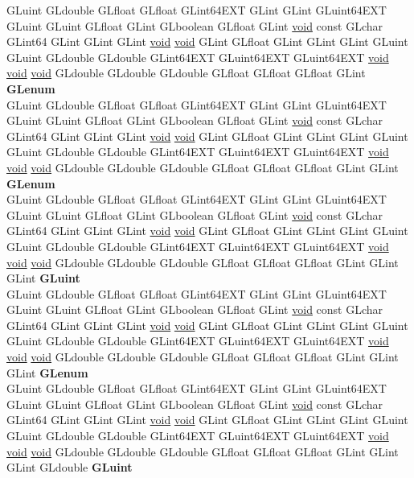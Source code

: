 \begin{DoxyCompactItemize}
\begin{tabbing}
\>GLuint GLdouble GLfloat GLfloat GLint64EXT GLint GLint GLuint64EXT GLuint GLuint GLfloat GLint GLboolean GLfloat GLint \hyperlink{interfacevoid}{void} const GLchar GLint64 GLint GLint GLint \hyperlink{interfacevoid}{void} \hyperlink{interfacevoid}{void} GLint GLfloat GLint GLint GLint GLuint GLuint GLdouble GLdouble GLint64EXT GLuint64EXT GLuint64EXT \hyperlink{interfacevoid}{void} \hyperlink{interfacevoid}{void} \hyperlink{interfacevoid}{void} GLdouble GLdouble GLdouble GLfloat GLfloat GLfloat GLint {\bfseries GLenum}\\
\>GLuint GLdouble GLfloat GLfloat GLint64EXT GLint GLint GLuint64EXT GLuint GLuint GLfloat GLint GLboolean GLfloat GLint \hyperlink{interfacevoid}{void} const GLchar GLint64 GLint GLint GLint \hyperlink{interfacevoid}{void} \hyperlink{interfacevoid}{void} GLint GLfloat GLint GLint GLint GLuint GLuint GLdouble GLdouble GLint64EXT GLuint64EXT GLuint64EXT \hyperlink{interfacevoid}{void} \hyperlink{interfacevoid}{void} \hyperlink{interfacevoid}{void} GLdouble GLdouble GLdouble GLfloat GLfloat GLfloat GLint GLint {\bfseries GLenum}\\
\>GLuint GLdouble GLfloat GLfloat GLint64EXT GLint GLint GLuint64EXT GLuint GLuint GLfloat GLint GLboolean GLfloat GLint \hyperlink{interfacevoid}{void} const GLchar GLint64 GLint GLint GLint \hyperlink{interfacevoid}{void} \hyperlink{interfacevoid}{void} GLint GLfloat GLint GLint GLint GLuint GLuint GLdouble GLdouble GLint64EXT GLuint64EXT GLuint64EXT \hyperlink{interfacevoid}{void} \hyperlink{interfacevoid}{void} \hyperlink{interfacevoid}{void} GLdouble GLdouble GLdouble GLfloat GLfloat GLfloat GLint GLint GLint {\bfseries GLuint}\\
\>GLuint GLdouble GLfloat GLfloat GLint64EXT GLint GLint GLuint64EXT GLuint GLuint GLfloat GLint GLboolean GLfloat GLint \hyperlink{interfacevoid}{void} const GLchar GLint64 GLint GLint GLint \hyperlink{interfacevoid}{void} \hyperlink{interfacevoid}{void} GLint GLfloat GLint GLint GLint GLuint GLuint GLdouble GLdouble GLint64EXT GLuint64EXT GLuint64EXT \hyperlink{interfacevoid}{void} \hyperlink{interfacevoid}{void} \hyperlink{interfacevoid}{void} GLdouble GLdouble GLdouble GLfloat GLfloat GLfloat GLint GLint GLint {\bfseries GLenum}\\
\>GLuint GLdouble GLfloat GLfloat GLint64EXT GLint GLint GLuint64EXT GLuint GLuint GLfloat GLint GLboolean GLfloat GLint \hyperlink{interfacevoid}{void} const GLchar GLint64 GLint GLint GLint \hyperlink{interfacevoid}{void} \hyperlink{interfacevoid}{void} GLint GLfloat GLint GLint GLint GLuint GLuint GLdouble GLdouble GLint64EXT GLuint64EXT GLuint64EXT \hyperlink{interfacevoid}{void} \hyperlink{interfacevoid}{void} \hyperlink{interfacevoid}{void} GLdouble GLdouble GLdouble GLfloat GLfloat GLfloat GLint GLint GLint GLdouble {\bfseries GLuint}\\

\end{tabbing}
\end{DoxyCompactItemize}
